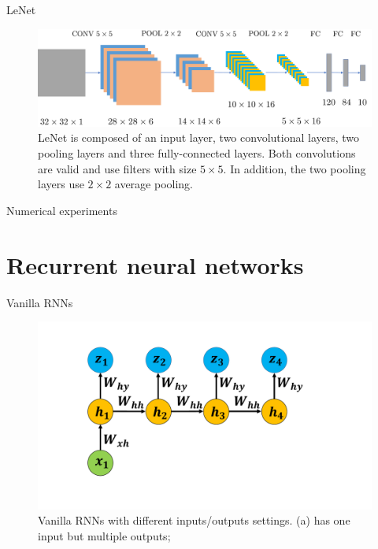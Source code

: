 \documentclass[presentation]{beamer}
\begin{document}
\begin{frame}{LeNet}
    \begin{figure}
    \centering
    \includegraphics[width=0.9 \textwidth]{LeNet}\caption{LeNet is composed of an input layer, two convolutional layers, two pooling layers and three fully-connected layers. Both convolutions are valid and use filters with size $5 \times 5$. In addition, the two pooling layers use $2 \times 2$ average pooling. \label{fig:CNN}}
    \end{figure}
    
\end{frame}


\begin{frame}{Numerical experiments}
    
\end{frame}

\section{Recurrent neural networks}

\begin{frame}{Vanilla RNNs}
    \begin{figure}
    \centering
    \includegraphics[width=0.8 \textwidth]{RNN1-1}
    \caption{Vanilla RNNs with different inputs/outputs settings. (a) has one input but multiple outputs; }
    \end{figure}
\end{frame}
\end{document}
